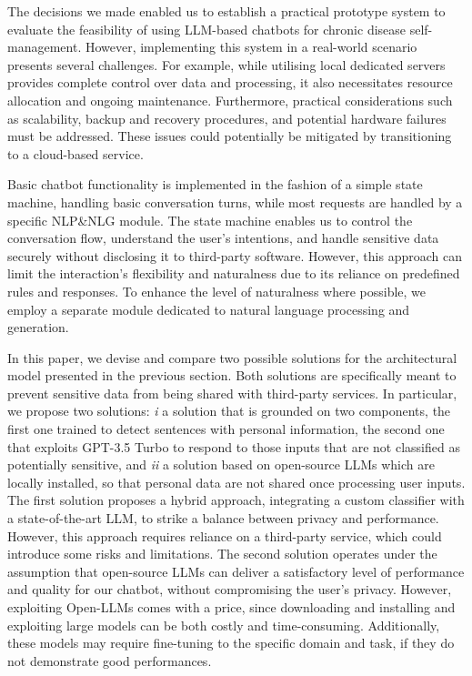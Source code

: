 The decisions we made enabled us to establish a practical prototype system to evaluate the feasibility of using LLM-based chatbots for chronic disease self-management. However, implementing this system in a real-world scenario presents several challenges.
For example, while utilising local dedicated servers provides complete control over data and processing, it also necessitates resource allocation and ongoing maintenance. Furthermore, practical considerations such as scalability, backup and recovery procedures, and potential hardware failures must be addressed. These issues could potentially be mitigated by transitioning to a cloud-based service.

Basic chatbot functionality is implemented in the fashion of a simple state machine, handling basic conversation turns, while most requests are handled by a specific NLP\&NLG module.
The state machine enables us to control the conversation flow, understand the user’s intentions, and handle sensitive data securely without disclosing it to third-party software. However, this approach can limit the interaction’s flexibility and naturalness due to its reliance on predefined rules and responses. To enhance the level of naturalness where possible, we employ a separate module dedicated to natural language processing and generation.

In this paper, we devise and compare two possible solutions for the architectural model presented in the previous section.
%
Both solutions are specifically meant to prevent sensitive data from being shared with third-party services.
%
In particular, we propose two solutions: \emph{i} a solution that is grounded on two components, the first one trained to detect sentences with personal information, the second one that exploits GPT-3.5 Turbo to respond to those inputs that are not classified as potentially sensitive, and \emph{ii} a solution based on open-source LLMs which are locally installed, 
so that personal data are not shared once processing user inputs.
The first solution proposes a hybrid approach, integrating a custom classifier with a state-of-the-art LLM, to strike a balance between privacy and performance. However, this approach requires reliance on a third-party service, which could introduce some risks and limitations.
%
The second solution operates under the assumption that open-source LLMs can deliver a satisfactory level of performance and quality for our chatbot, without compromising the user’s privacy. However, exploiting Open-LLMs comes with a price, since downloading and installing and exploiting large models can be both costly and time-consuming. Additionally, these models may require fine-tuning to the specific domain and task, if they do not demonstrate good performances.
%

